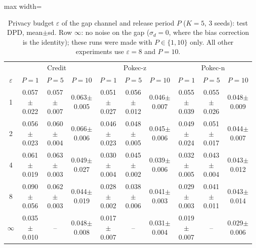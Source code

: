 \begin{table}[tbp]
\centering
\scriptsize
\setlength{\tabcolsep}{3pt}
\caption{Privacy budget $\varepsilon$ of the gap channel and release period $P$ ($K=5$, 3 seeds): test DPD, mean$\pm$sd. Row $\infty$: no noise on the gap ($\sigma_d=0$, where the bias correction is the identity); these runs were made with $P\in\{1,10\}$ only. All other experiments use $\varepsilon=8$ and $P=10$.}
\label{tab:e5}
\begin{adjustbox}{max width=\textwidth}
\begin{tabular}{cccccccccc}
\toprule
 & \multicolumn{3}{c}{Credit} & \multicolumn{3}{c}{Pokec-z} & \multicolumn{3}{c}{Pokec-n} \\
$\varepsilon$ & $P=1$ & $P=5$ & $P=10$ & $P=1$ & $P=5$ & $P=10$ & $P=1$ & $P=5$ & $P=10$ \\
\midrule
1 & 0.057$\pm$0.022 & 0.057$\pm$0.007 & 0.063$\pm$0.005 & 0.051$\pm$0.027 & 0.056$\pm$0.012 & 0.046$\pm$0.007 & 0.055$\pm$0.039 & 0.055$\pm$0.026 & 0.048$\pm$0.009 \\
2 & 0.056$\pm$0.023 & 0.060$\pm$0.004 & 0.066$\pm$0.006 & 0.046$\pm$0.023 & 0.048$\pm$0.005 & 0.045$\pm$0.006 & 0.049$\pm$0.024 & 0.051$\pm$0.017 & 0.044$\pm$0.007 \\
4 & 0.061$\pm$0.019 & 0.063$\pm$0.003 & 0.049$\pm$0.027 & 0.030$\pm$0.004 & 0.045$\pm$0.002 & 0.039$\pm$0.006 & 0.032$\pm$0.005 & 0.043$\pm$0.004 & 0.043$\pm$0.012 \\
8 & 0.090$\pm$0.056 & 0.062$\pm$0.003 & 0.044$\pm$0.019 & 0.028$\pm$0.002 & 0.038$\pm$0.006 & 0.041$\pm$0.003 & 0.029$\pm$0.003 & 0.041$\pm$0.011 & 0.043$\pm$0.014 \\
\midrule
$\infty$ & 0.035$\pm$0.010 & -- & 0.048$\pm$0.008 & 0.017$\pm$0.007 & -- & 0.031$\pm$0.004 & 0.019$\pm$0.007 & -- & 0.029$\pm$0.006 \\
\bottomrule
\end{tabular}
\end{adjustbox}
\end{table}
